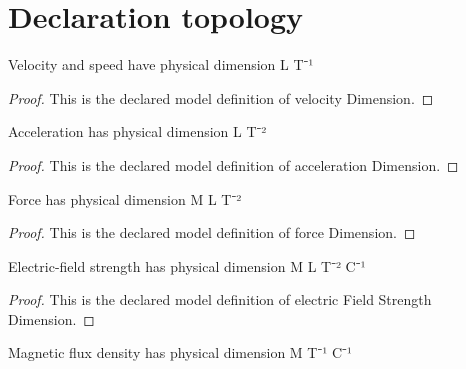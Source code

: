 \section{Declaration topology}
\begin{definition}
  \label{def:physics:phyx-mini-0958:phyxminiproblems-problemphyxmini0958-velocitydimension}
  Velocity and speed have physical dimension L T⁻¹
\end{definition}
\begin{proof}
  This is the declared model definition of velocity Dimension.
\end{proof}
\begin{definition}
  \label{def:physics:phyx-mini-0958:phyxminiproblems-problemphyxmini0958-accelerationdimension}
  Acceleration has physical dimension L T⁻²
\end{definition}
\begin{proof}
  This is the declared model definition of acceleration Dimension.
\end{proof}
\begin{definition}
  \label{def:physics:phyx-mini-0958:phyxminiproblems-problemphyxmini0958-forcedimension}
  Force has physical dimension M L T⁻²
\end{definition}
\begin{proof}
  This is the declared model definition of force Dimension.
\end{proof}
\begin{definition}
  \label{def:physics:phyx-mini-0958:phyxminiproblems-problemphyxmini0958-electricfieldstrengthdimension}
  Electric-field strength has physical dimension M L T⁻² C⁻¹
\end{definition}
\begin{proof}
  This is the declared model definition of electric Field Strength Dimension.
\end{proof}
\begin{definition}
  \label{def:physics:phyx-mini-0958:phyxminiproblems-problemphyxmini0958-magneticfluxdensitydimension}
  Magnetic flux density has physical dimension M T⁻¹ C⁻¹
\end{definition}
